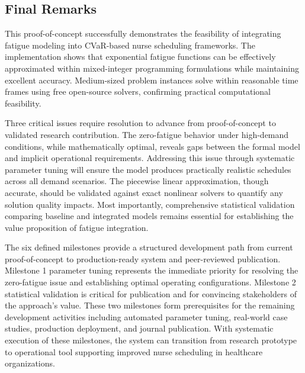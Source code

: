 \documentclass[11pt,letterpaper]{article}
\begin{document}
\subsection{Final Remarks}
This proof-of-concept successfully demonstrates the feasibility of integrating fatigue modeling into CVaR-based nurse scheduling frameworks. The implementation shows that exponential fatigue functions can be effectively approximated within mixed-integer programming formulations while maintaining excellent accuracy. Medium-sized problem instances solve within reasonable time frames using free open-source solvers, confirming practical computational feasibility.

Three critical issues require resolution to advance from proof-of-concept to validated research contribution. The zero-fatigue behavior under high-demand conditions, while mathematically optimal, reveals gaps between the formal model and implicit operational requirements. Addressing this issue through systematic parameter tuning will ensure the model produces practically realistic schedules across all demand scenarios. The piecewise linear approximation, though accurate, should be validated against exact nonlinear solvers to quantify any solution quality impacts. Most importantly, comprehensive statistical validation comparing baseline and integrated models remains essential for establishing the value proposition of fatigue integration.

The six defined milestones provide a structured development path from current proof-of-concept to production-ready system and peer-reviewed publication. Milestone 1 parameter tuning represents the immediate priority for resolving the zero-fatigue issue and establishing optimal operating configurations. Milestone 2 statistical validation is critical for publication and for convincing stakeholders of the approach's value. These two milestones form prerequisites for the remaining development activities including automated parameter tuning, real-world case studies, production deployment, and journal publication. With systematic execution of these milestones, the system can transition from research prototype to operational tool supporting improved nurse scheduling in healthcare organizations.
\end{document}
